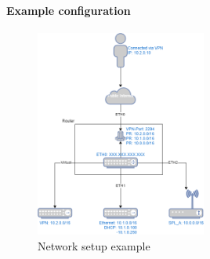 \paragraph{Example configuration}

\begin{figure}[ht!]
    \centering
    \includegraphics[width=0.5\textwidth]{figs/network.png}
    \caption{Network setup example}
\end{figure}

